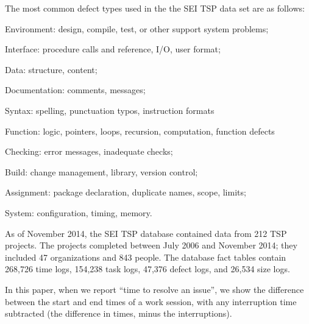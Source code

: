The most common defect types used in the the SEI TSP data set are as follows:
\be 
\item Environment: design, compile, test, or other support system problems;
\item Interface: procedure calls and reference, I/O, user format;
\item Data: structure, content; 
\item Documentation: comments, messages;
\item Syntax: spelling, punctuation typos, instruction formats
\item Function: logic, pointers, loops, recursion, computation, function defects  
\item Checking: error messages, inadequate checks;
\item Build: change management, library, version control;
\item Assignment: package
declaration, duplicate names, scope, limits;
\item System: configuration, timing, memory.
\ee


As of November 2014, the SEI TSP database contained data from 212
TSP projects. The projects completed between July 2006 and
November 2014; they included 47 organizations and 843 people. 
The database fact tables
contain 268,726 time logs, 
154,238 task logs,
 47,376 defect logs, 
and 26,534 size logs. 
 
In this paper, when we report ``time to resolve an
issue'', we show the difference between the start and end times
of a work session, with any interruption time subtracted (the
difference in times, minus the interruptions). 


%
 
